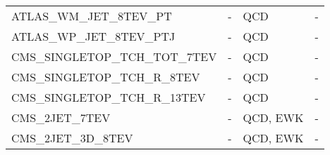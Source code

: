 \begin{center}
{\begin{tabular}{llll}
        ATLAS\_WM\_JET\_8TEV\_PT                   &                 - &       QCD &            - \\
        ATLAS\_WP\_JET\_8TEV\_PTJ                  &                 - &       QCD &            - \\
        CMS\_SINGLETOP\_TCH\_TOT\_7TEV             &                 - &       QCD &            - \\
        CMS\_SINGLETOP\_TCH\_R\_8TEV               &                 - &       QCD &            - \\
        CMS\_SINGLETOP\_TCH\_R\_13TEV              &                 - &       QCD &            - \\
        CMS\_2JET\_7TEV                          &                 - &  QCD, EWK &            - \\
        CMS\_2JET\_3D\_8TEV                       &                 - &  QCD, EWK &            - \\
        \bottomrule
        \end{tabular}}
\end{center}